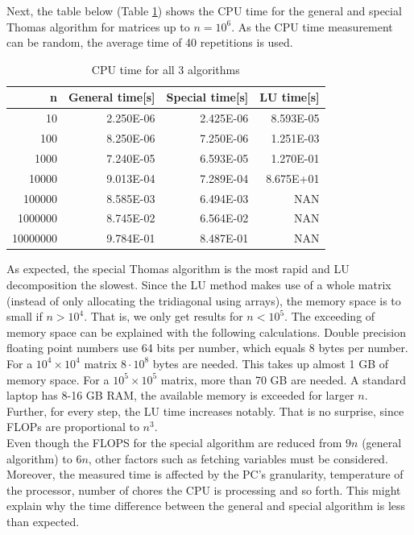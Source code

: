 \documentclass[%
oneside,                 %
final,                   %
10pt]{article}
\begin{document}
Next, the table below (Table \ref{CPUtime}) shows the CPU time for the general and special Thomas algorithm for matrices up to $n=10^6$. As the CPU time measurement can be random, the average time of 40 repetitions is used.
\begin{table}[H]
\caption{CPU time for all 3 algorithms}
\centering
\begin{tabular}{rrrr}
\toprule
    n & General time[s] & Special time[s] & LU time[s] \\
\midrule
    10 &    2.250E-06 &    2.425E-06 &  8.593E-05 \\
   100 &    8.250E-06 &    7.250E-06 &  1.251E-03 \\
   1000 &    7.240E-05 &    6.593E-05 &  1.270E-01 \\
  10000 &    9.013E-04 &    7.289E-04 &  8.675E+01 \\
  100000 &    8.585E-03 &    6.494E-03 &     NAN \\
 1000000 &    8.745E-02 &    6.564E-02 &     NAN \\
 10000000 &    9.784E-01 &    8.487E-01 &     NAN \\
\bottomrule
\end{tabular}
\label{CPUtime}
\end{table}
As expected, the special Thomas algorithm is the most rapid and LU decomposition the slowest. Since the LU method makes use of a whole matrix (instead of only allocating the tridiagonal using arrays), the memory space is to small if $n>10^4$. That is, we only get results for $n<10^5$.
The exceeding of memory space can be explained with the following calculations. Double precision floating point numbers use 64 bits per number, which equals 8 bytes per number. For a $10^4 \times 10^4$ matrix $8 \cdot 10^8$ bytes are needed. This takes up almost 1 GB of memory space. For a  $10^5 \times 10^5$ matrix, more than 70 GB are needed. A standard laptop has 8-16 GB RAM, the available memory is exceeded for larger $n$.\\
Further, for every step, the LU time increases notably. That is no surprise, since FLOPs are proportional to $n^3$.\\
Even though the FLOPS for the special algorithm are reduced from $9n$ (general algorithm) to $6n$, other factors such as fetching variables must be considered. Moreover, the measured time is affected by the PC's granularity, temperature of the processor, number of chores the CPU is processing and so forth. This might explain why the time difference between the general and special algorithm is less than expected.
\end{document}

